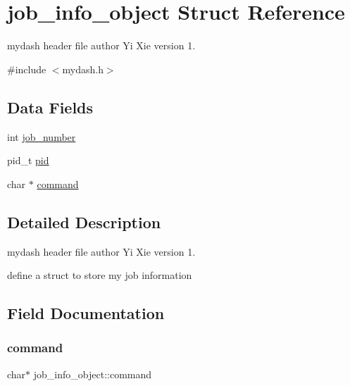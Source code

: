 \hypertarget{structjob__info__object}{}\section{job\+\_\+info\+\_\+object Struct Reference}
\label{structjob__info__object}


mydash header file author Yi Xie version 1.  




{\ttfamily \#include $<$mydash.\+h$>$}

\subsection*{Data Fields}
\begin{DoxyCompactItemize}
\item 
int \hyperlink{structjob__info__object_a7ec551d2a3b5289402ab6c63927919d8}{job\+\_\+number}
\item 
pid\+\_\+t \hyperlink{structjob__info__object_aa0d8664138390bff34865cc1b8a69b30}{pid}
\item 
char $\ast$ \hyperlink{structjob__info__object_a7635cccb7f2b786fcb4bd9ffa00dc320}{command}
\end{DoxyCompactItemize}


\subsection{Detailed Description}
mydash header file author Yi Xie version 1. 

define a struct to store my job information 

\subsection{Field Documentation}
\mbox{\label{structjob__info__object_a7635cccb7f2b786fcb4bd9ffa00dc320}} 
\subsubsection{\texorpdfstring{command}{command}}
{\footnotesize\ttfamily char$\ast$ job\+\_\+info\+\_\+object\+::command}

\mbox{\label{structjob__info__object_a7ec551d2a3b5289402ab6c63927919d8}} 
